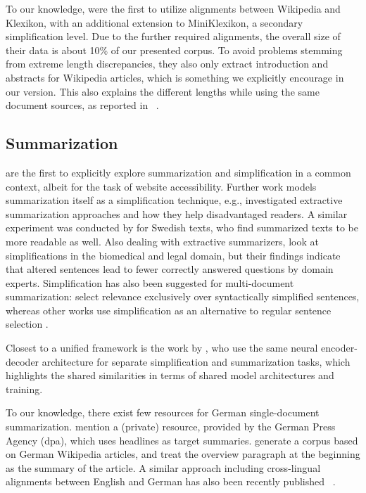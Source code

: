 \documentclass[10pt, a4paper]{article}
\begin{document}
To our knowledge, \cite{hewett-stede-2021-automatically} were the first to utilize alignments between Wikipedia and Klexikon, with an additional extension to MiniKlexikon, a secondary simplification level. Due to the further required alignments, the overall size of their data is about 10\% of our presented corpus. To avoid problems stemming from extreme length discrepancies, they also only extract introduction and abstracts for Wikipedia articles, which is something we explicitly encourage in our version. This also explains the different lengths while using the same document sources, as reported in ~.




\subsection{Summarization}
\cite{parmanto2005access} are the first to explicitly explore summarization and simplification in a common context, albeit for the task of website accessibility.
Further work models summarization itself as a simplification technique, e.g., 
\cite{margarido2008automatic} investigated extractive summarization approaches and how they help disadvantaged readers. A similar experiment was conducted by \cite{smith-jonsson-2011-automatic} for Swedish texts, who find summarized texts to be more readable as well.
Also dealing with extractive summarizers, \cite{finegan2016sentence} look at simplifications in the biomedical and legal domain, but their findings indicate that altered sentences lead to fewer correctly answered questions by domain experts.
Simplification has also been suggested for multi-document summarization:
\cite{siddharthan-etal-2004-syntactic} select relevance exclusively over syntactically simplified sentences, whereas other works use simplification as an alternative to regular sentence selection \cite{vanderwende2006beyond,yih2007multi}.

Closest to a unified framework is the work by \cite{ma2017semantic}, who use the same neural encoder-decoder architecture for separate simplification and summarization tasks, which highlights the shared similarities in terms of shared model architectures and training.

To our knowledge, there exist few resources for German single-document summarization. \cite{nitsche2019abstractive} mention a (private) resource, provided by the German Press Agency (dpa), which uses headlines as target summaries. \cite{frefel-2020-summarization} generate a corpus based on German Wikipedia articles, and treat the overview paragraph at the beginning as the summary of the article. A similar approach including cross-lingual alignments between English and German has also been recently published \cite{fatima-strube-2021-novel}~.
\end{document}
